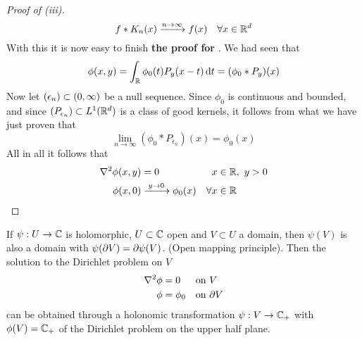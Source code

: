 \documentclass[../../script.tex]{subfiles}
\begin{document}
\begin{proof}[Proof of  (iii)]
    \begin{equation}
        f * K_n(x) \conv{n \rightarrow \infty} f(x) \quad \forall x \in \realn^d
    \end{equation}
    With this it is now easy to finish \textbf{the proof for }. We had seen that 
    \begin{equation}
        \phi(x, y) = \int_{\realn} \phi_0(t) P_y(x - t) \dd{t} = (\phi_0 * P_y)(x)
    \end{equation}
    Now let $\anyseqdef[\epsilon]{(0, \infty)}$ be a null sequence. Since $\phi_0$ is continuous and bounded, 
    and since $\left(P_{\epsilon_n}\right) \subset {L^1(\realn^d)}$ is a class of good kernels, it follows from what we have just proven that
    \begin{equation}
        \lim_{n \rightarrow \infty} (\phi_0 * P_{\epsilon_n})(x) = \phi_0(x)
    \end{equation}
    All in all it follows that 
    \begin{align}
        \laplacian \phi(x, y) &= 0 & x &\in \realn, ~y > 0 \\
        \phi(x, 0) &\conv{y \rightarrow 0} \phi_0(x) & \forall x &\in \realn \nonumber
    \end{align}
\end{proof}

\begin{rem}
    If $\psi: U \rightarrow \cmpln$ is holomorphic, $U \subset \cmpln$ open and $V \subset U$ a domain, then $\psi(V)$ is also a domain with $\psi(\boundary{V}) = \boundary{\psi(V)}$.
    (Open mapping principle). Then the solution to the Dirichlet problem on $V$ 
    \begin{align*}
        \laplacian \phi &= 0 & \text{on } &V \\
        \phi &= \phi_0 & \text{on } &\boundary{V}
    \end{align*}
    can be obtained through a holonomic transformation $\psi: V \rightarrow \cmpln_+$ with $\phi(V) = \cmpln_+$ of the Dirichlet problem on the upper half plane.
\end{rem}
\end{document}
